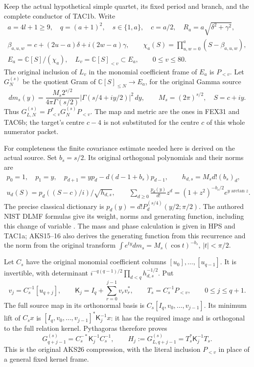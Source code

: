 \documentclass[11pt,a4paper]{article}
\begin{document}
Keep the actual hypothetical simple quartet, its fixed period and branch,
and the complete conductor of TAC1b. Write
\[
\begin{gathered}
 a=4l+1\ge9,\quad q=(a+1)^2,\quad s\in\{1,a\},\quad
 c=a/2,\quad R_a=a\sqrt{\delta^2+\gamma^2},\\
 \beta_{a,u,w}=c+(2u-a)\delta+i(2w-a)\gamma,\qquad
 \chi_a(S)=\prod_{u,w=0}^{a}(S-\beta_{a,u,w}),\\
 E_a=\mathbb C[S]/(\chi_a),\quad
 L_v=\mathbb C[S]_{<v}\subset E_a,\qquad 0\le v\le80.
\end{gathered}\tag{LRP1}
\]
The original inclusion of $L_v$ in the monomial coefficient frame of
$E_a$ is $P_{<v}$. Let $G_N^{(s)}$ be the quotient Gram of
$\mathbb C[S]_{\le N}\to E_a$, for the original Gamma source
\[
 dm_s(y)=\frac{M_s2^{s/2}}{4\pi\Gamma(s/2)}
    |\Gamma(s/4+iy/2)|^2\,dy,\qquad M_s=(2\pi)^{s/2},\quad S=c+iy.
 \tag{LRP2}
\]
Thus $G_{L,N}^{(s)}=P_{<v}^*G_N^{(s)}P_{<v}$. The map and metric are
the ones in FEX31 and TAC6b; the target's centre $c-4$ is not substituted
for the centre $c$ of this whole numerator packet.

For completeness the finite covariance estimate needed here is derived
on the actual source. Set $b_s=s/2$. Its original orthogonal polynomials
and their norms are
\[
\begin{gathered}
 p_0=1,\quad p_1=y,\quad
 p_{d+1}=yp_d-d(d-1+b_s)p_{d-1},\qquad h_{d,s}=M_s d!(b_s)_d,\\
 u_d(S)=p_d((S-c)/i)/\sqrt{h_{d,s}},\qquad
 \sum_{d\ge0}\frac{p_d(y)}{d!}z^d
       =(1+z^2)^{-b_s/2}e^{y\arctan z}.
\end{gathered}\tag{LRP3}
\]
The precise classical dictionary is
$p_d(y)=d!P_d^{(s/4)}(y/2;\pi/2)$.
The authored NIST DLMF formulas give its weight, norms and generating
function, including this change of variable
\cite[eqs.~(18.19.8)--(18.19.9), (18.23.7)]{human:dlmf18}.
The mass and phase calculation is given in HPS and TAC1a; AKS15--16
also derives the generating function from this recurrence and the norm
from the original transform
$\int e^{ty}dm_s=M_s(\cos t)^{-b_s}$, $|t|<\pi/2$.

Let $C_s$ have the original monomial coefficient columns
$[u_0],\ldots,[u_{q-1}]$. It is invertible, with determinant
$i^{-q(q-1)/2}\prod_{d<q}h_{d,s}^{-1/2}$. Put
\[
 v_j=C_s^{-1}[u_{q+j}],\qquad
 \mathsf K_j=I_q+\sum_{r=0}^{j-1}v_rv_r^*,\qquad
 T_s=C_s^{-1}P_{<v},\qquad 0\le j\le q+1.
 \tag{LRP4}
\]
The full source map in its orthonormal basis is
$C_s[I_q,v_0,\ldots,v_{j-1}]$. Its minimum lift of $C_sx$ is
$[I_q,v_0,\ldots,v_{j-1}]^*\mathsf K_j^{-1}x$:
it has the required image and is orthogonal to the full relation kernel.
Pythagoras therefore proves
\[
 G_{q+j-1}^{(s)}=C_s^{-*}\mathsf K_j^{-1}C_s^{-1},\qquad
 H_j:=G_{L,q+j-1}^{(s)}=T_s^*\mathsf K_j^{-1}T_s.
 \tag{LRP5}
\]
This is the original AKS26 compression, with the literal inclusion
$P_{<v}$ in place of a general fixed kernel frame.
\end{document}
